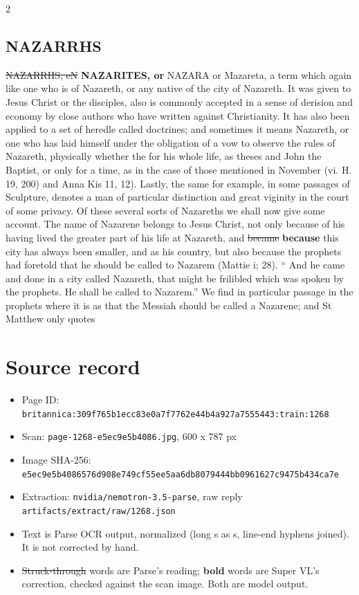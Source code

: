 \documentclass[10pt]{article}
\begin{document}
\begin{multicols}{2}
\subsection*{NAZARRHS}
\sout{NAZARRHS, eN} \textbf{NAZARITES, or} NAZARA or Mazareta, a term which again like one who is of Nazareth, or any native of the city of Nazareth. It was given to Jesus Christ or the disciples, also is commonly accepted in a sense of derision and economy by close authors who have written against Christianity. It has also been applied to a set of heredle called doctrines; and sometimes it means Nazareth, or one who has laid himself under the obligation of a vow to observe the rules of Nazareth, physically whether the for his whole life, as theses and John the Baptist, or only for a time, as in the case of those mentioned in November (vi. H. 19, 200) and Anna Kis 11, 12). Lastly, the same for example, in some passages of Sculpture, denotes a man of particular distinction and great viginity in the court of some privacy. Of these several sorts of Nazareths we shall now give some account. The name of Nazarene belongs to Jesus Christ, not only because of his having lived the greater part of his life at Nazareth, and \sout{became} \textbf{because} this city has always been smaller, and as his country, but also because the prophets had foretold that he should be called to Nazarem (Mattie i; 28). “ And he came and done in a city called Nazareth, that might be frilibled which was spoken by the prophets. He shall be called to Nazarem.” We find in particular passage in the prophets where it is as that the Messiah should be called a Nazarene; and St Matthew only quotes
\end{multicols}
\section*{Source record}
\begin{itemize}
\item Page ID: \texttt{britannica:309f765b1ecc83e0a7f7762e44b4a927a7555443:train:1268}
\item Scan: \texttt{page-1268-e5ec9e5b4086.jpg}, 600 x 787 px
\item Image SHA-256: \texttt{\small e5ec9e5b4086576d908e749cf55ee5aa6db8079444bb0961627c9475b434ca7e}
\item Extraction: \texttt{nvidia/nemotron-3.5-parse}, raw reply \texttt{artifacts/extract/raw/1268.json}
\item Text is Parse OCR output, normalized (long s as s, line-end hyphens joined). It is not corrected by hand.
\item \sout{Struck-through} words are Parse's reading; \textbf{bold} words are Super VL's correction, checked against the scan image. Both are model output.
\end{itemize}
\end{document}
